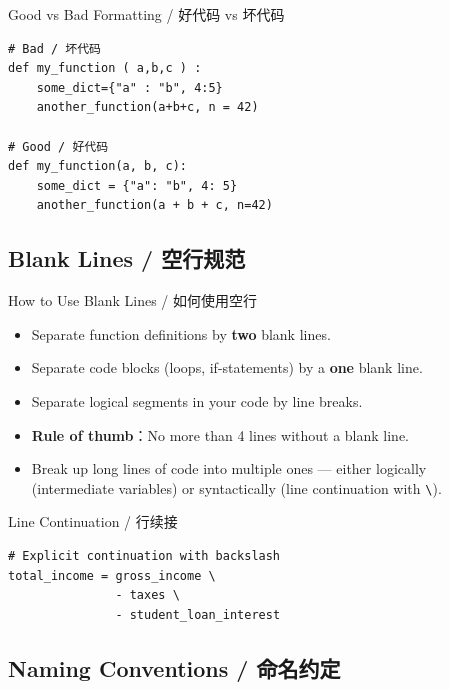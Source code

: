 \documentclass[11pt,a4paper]{report}
\let\oldtexttt\texttt
\renewcommand{\texttt}[1]{\textcolor{mainblue}{\oldtexttt{#1}}}
\begin{document}
\begin{examplebox}{Good vs Bad Formatting / 好代码 vs 坏代码}
\begin{lstlisting}
# Bad / 坏代码
def my_function ( a,b,c ) :
    some_dict={"a" : "b", 4:5}
    another_function(a+b+c, n = 42)

# Good / 好代码
def my_function(a, b, c):
    some_dict = {"a": "b", 4: 5}
    another_function(a + b + c, n=42)
\end{lstlisting}
\end{examplebox}

\subsection{Blank Lines / 空行规范}

\begin{concept}{How to Use Blank Lines / 如何使用空行}
    \begin{itemize}[itemsep=0.5em]
        \item Separate function definitions by \textbf{two} blank lines.
        \item Separate code blocks (loops, if-statements) by a \textbf{one} blank line.
        \item Separate logical segments in your code by line breaks.
        \item \textbf{Rule of thumb}：No more than 4 lines without a blank line.
        \item Break up long lines of code into multiple ones — either logically (intermediate variables) or syntactically (line continuation with \texttt{\textbackslash}).
    \end{itemize}
\end{concept}

\begin{examplebox}{Line Continuation / 行续接}
\begin{lstlisting}
# Explicit continuation with backslash
total_income = gross_income \
               - taxes \
               - student_loan_interest
\end{lstlisting}
\end{examplebox}

\subsection{Naming Conventions / 命名约定}
\end{document}
